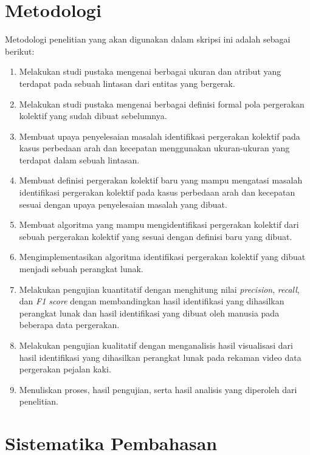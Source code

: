 \section{Metodologi}
\label{sec:metlit}

Metodologi penelitian yang akan digunakan dalam skripsi ini adalah sebagai berikut:

\begin{enumerate}
    \item Melakukan studi pustaka mengenai berbagai ukuran dan atribut yang terdapat pada sebuah lintasan dari entitas yang bergerak.
    \item Melakukan studi pustaka mengenai berbagai definisi formal pola pergerakan kolektif yang sudah dibuat sebelumnya.
    \item Membuat upaya penyelesaian masalah identifikasi pergerakan kolektif pada kasus perbedaan arah dan kecepatan menggunakan ukuran-ukuran yang terdapat dalam sebuah lintasan.
    \item Membuat definisi pergerakan kolektif baru yang mampu mengatasi masalah identifikasi pergerakan kolektif pada kasus perbedaan arah dan kecepatan sesuai dengan upaya penyelesaian masalah yang dibuat.
    \item Membuat algoritma yang mampu mengidentifikasi pergerakan kolektif dari sebuah pergerakan kolektif yang sesuai dengan definisi baru yang dibuat.
    \item Mengimplementasikan algoritma identifikasi pergerakan kolektif yang dibuat menjadi sebuah perangkat lunak.
    \item Melakukan pengujian kuantitatif dengan menghitung nilai \textit{precision}, \textit{recall}, dan \textit{F1 score} dengan membandingkan hasil identifikasi yang dihasilkan perangkat lunak dan hasil identifikasi yang dibuat oleh manusia pada beberapa data pergerakan.
    \item Melakukan pengujian kualitatif dengan menganalisis hasil visualisasi dari hasil identifikasi yang dihasilkan perangkat lunak pada rekaman video data pergerakan pejalan kaki.
    \item Menuliskan proses, hasil pengujian, serta hasil analisis yang diperoleh dari penelitian.
\end{enumerate}

\section{Sistematika Pembahasan}
\label{sec:sispem}

